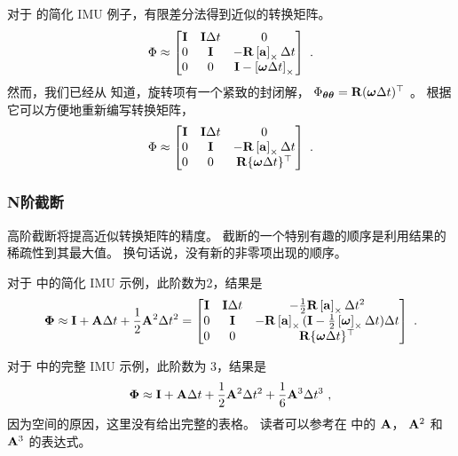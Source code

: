对于  的简化 IMU 例子，有限差分法得到近似的转换矩阵。
%
\begin{equation}
\Phi \approx \begin{bmatrix}
{\bf I} & {\bf I}\Delta t & 0 \\
0 & {\bf I} & -{\bf R}\left[{\bf a}\right]_\times\Delta t \\
0 & 0 & {\bf I}-\left[{\bm \omega}\Delta t\right]_\times
\end{bmatrix}~.
\end{equation}
%
然而，我们已经从  知道，旋转项有一个紧致的封闭解， $\Phi_{{\bm \theta}{\bm \theta}}={\bf R}({\bm \omega} \Delta t)^{\top}$ 。
根据它可以方便地重新编写转换矩阵，
%
\begin{equation}
\Phi \approx \begin{bmatrix}
{\bf I} & {\bf I}\Delta t & 0 \\
0 & {\bf I} & -{\bf R}\left[{\bf a}\right]_\times\Delta t \\
0 & 0 & {\bf R}\{{\bm \omega}\Delta t\}^{\top}
\end{bmatrix}~.
\end{equation}

\subsubsection{N阶截断}

高阶截断将提高近似转换矩阵的精度。 
截断的一个特别有趣的顺序是利用结果的稀疏性到其最大值。 
换句话说，没有新的非零项出现的顺序。

对于  中的简化 IMU 示例，此阶数为2，结果是
%
\begin{equation}
{\bf\Phi} 
\approx {\bf I} + {\bf A}\Delta t + \frac12{\bf A}^2\Delta t^2
= \begin{bmatrix}
{\bf I} & {\bf I}\Delta t & -\frac12{\bf R}\left[{\bf a}\right]_\times\Delta t^2                           \\
0    & {\bf I}    &        -{\bf R}\left[{\bf a}\right]_\times({\bf I} - \frac12\left[{\bm \omega}\right]_\times\Delta t)\Delta t  \\
0    & 0       &         {\bf R}\{{\bm \omega}\Delta t\}^{\top}
\end{bmatrix}~.
\end{equation}

对于  中的完整 IMU 示例，此阶数为 3，结果是
%
\begin{equation}
{\bf\Phi} \approx {\bf I} + {\bf A}\Delta t + \frac12{\bf A}^2\Delta t^2 + \frac16{\bf A}^3\Delta t^3~,
\end{equation}
%
因为空间的原因，这里没有给出完整的表格。 
读者可以参考在  中的 ${\bf A}$， ${\bf A}^2$ 和 ${\bf A}^3$ 的表达式。


